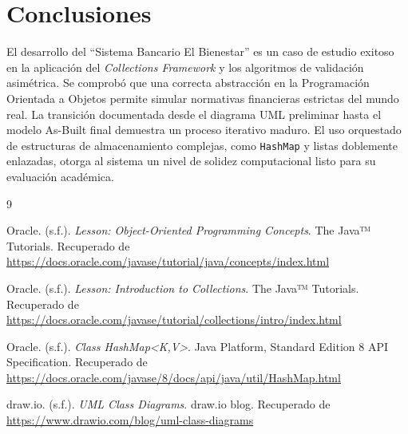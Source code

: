 \documentclass[12pt, letterpaper]{article}
\begin{document}
	\section{Conclusiones}
	El desarrollo del ``Sistema Bancario El Bienestar'' es un caso de estudio exitoso en la aplicación del \textit{Collections Framework} y los algoritmos de validación asimétrica. Se comprobó que una correcta abstracción en la Programación Orientada a Objetos permite simular normativas financieras estrictas del mundo real. La transición documentada desde el diagrama UML preliminar hasta el modelo As-Built final demuestra un proceso iterativo maduro. El uso orquestado de estructuras de almacenamiento complejas, como \texttt{HashMap} y listas doblemente enlazadas, otorga al sistema un nivel de solidez computacional listo para su evaluación académica.
	
	\newpage
	\renewcommand{\refname}{Bibliografía}
	\begin{thebibliography}{9}
		
		Oracle. (s.f.). \textit{Lesson: Object-Oriented Programming Concepts}. The Java™ Tutorials. Recuperado de \url{https://docs.oracle.com/javase/tutorial/java/concepts/index.html}
		
		Oracle. (s.f.). \textit{Lesson: Introduction to Collections}. The Java™ Tutorials. Recuperado de \url{https://docs.oracle.com/javase/tutorial/collections/intro/index.html}
		
		Oracle. (s.f.). \textit{Class HashMap<K,V>}. Java Platform, Standard Edition 8 API Specification. Recuperado de \url{https://docs.oracle.com/javase/8/docs/api/java/util/HashMap.html}
		
		draw.io. (s.f.). \textit{UML Class Diagrams}. draw.io blog. Recuperado de \url{https://www.drawio.com/blog/uml-class-diagrams}
		
	\end{thebibliography}
	
\end{document}
